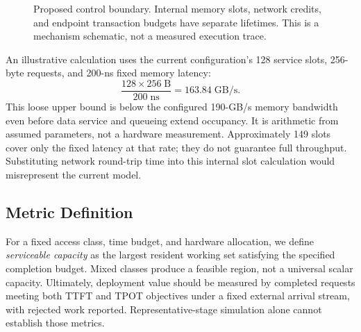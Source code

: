 \begin{figure}[t]
\centering
\setlength{\fboxsep}{6pt}
\caption{Proposed control boundary. Internal memory slots, network
credits, and endpoint transaction budgets have separate lifetimes.
This is a mechanism schematic, not a measured execution trace.}
\label{fig:lifetime}
\end{figure}

An illustrative calculation uses the current configuration's 128 service
slots, 256-byte requests, and 200-ns fixed memory latency:
\begin{equation}
  \frac{128\times256\;\mathrm{B}}{200\;\mathrm{ns}}
  = 163.84\;\mathrm{GB/s}.
\end{equation}
This loose upper bound is below the configured 190-GB/s memory bandwidth
even before data service and queueing extend occupancy. It is arithmetic
from assumed parameters, not a hardware measurement. Approximately 149
slots cover only the fixed latency at that rate; they do not guarantee
full throughput. Substituting network round-trip time into this internal
slot calculation would misrepresent the current model.

\subsection{Metric Definition}
For a fixed access class, time budget, and hardware allocation, we define
\emph{serviceable capacity} as the largest resident working set satisfying
the specified completion budget. Mixed classes produce a feasible region,
not a universal scalar capacity. Ultimately, deployment value should be
measured by completed requests meeting both TTFT and TPOT objectives
under a fixed external arrival stream, with rejected work reported.
Representative-stage simulation alone cannot establish those metrics.
